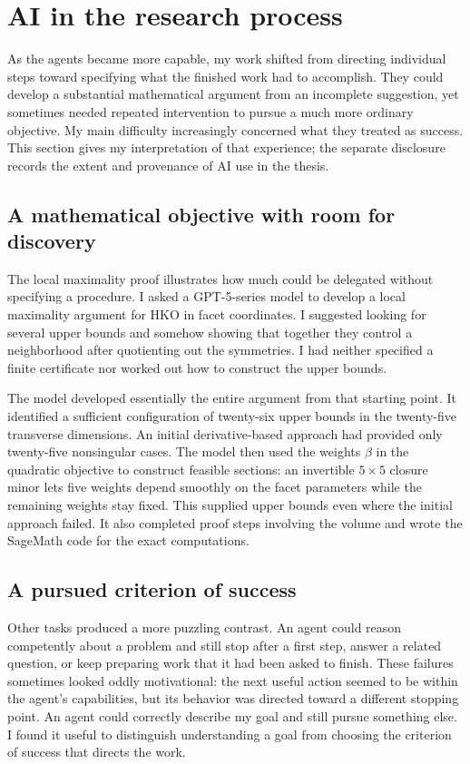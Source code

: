 \clearpage
\section{AI in the research process}
\label{sec:use-of-ai}

As the agents became more capable, my work shifted from directing individual
steps toward specifying what the finished work had to accomplish. They could
develop a substantial mathematical argument from an incomplete suggestion,
yet sometimes needed repeated intervention to pursue a much more ordinary
objective. My main difficulty increasingly concerned what they treated as
success. This section gives my interpretation of that experience; the separate
disclosure records the extent and provenance of AI use in the thesis.

\subsection{A mathematical objective with room for discovery}

The local maximality proof illustrates how much could be delegated without
specifying a procedure. I asked a GPT-5-series model to develop a local
maximality argument for HKO in facet coordinates. I suggested looking for several upper bounds and
somehow showing that together they control a neighborhood after quotienting
out the symmetries. I had neither specified a finite certificate nor worked
out how to construct the upper bounds.

The model developed essentially the entire argument from that starting
point. It identified a sufficient configuration of twenty-six upper bounds
in the twenty-five transverse dimensions. An initial derivative-based
approach had provided only twenty-five nonsingular cases. The model then
used the weights $\beta$ in the quadratic objective to construct feasible
sections: an invertible $5\times5$ closure minor lets five weights depend
smoothly on the facet parameters while the remaining weights stay fixed.
This supplied upper bounds even where the initial approach failed. It also
completed proof steps involving the volume and wrote the SageMath code for
the exact computations.

\subsection{A pursued criterion of success}

Other tasks produced a more puzzling contrast. An agent could reason
competently about a problem and still stop after a first step, answer a
related question, or keep preparing work that it had been asked to finish.
These failures sometimes looked oddly motivational: the next useful action
seemed to be within the agent's capabilities, but its behavior was directed
toward a different stopping point. An agent could correctly describe my goal
and still pursue something else. I found it useful to distinguish understanding
a goal from choosing the criterion of success that directs the work.


